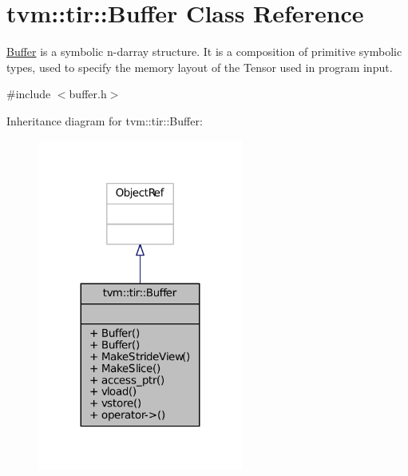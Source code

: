 \hypertarget{classtvm_1_1tir_1_1Buffer}{}\section{tvm\+:\+:tir\+:\+:Buffer Class Reference}
\label{classtvm_1_1tir_1_1Buffer}


\hyperlink{classtvm_1_1tir_1_1Buffer}{Buffer} is a symbolic n-\/darray structure. It is a composition of primitive symbolic types, used to specify the memory layout of the Tensor used in program input.  




{\ttfamily \#include $<$buffer.\+h$>$}



Inheritance diagram for tvm\+:\+:tir\+:\+:Buffer\+:
\nopagebreak
\begin{figure}[H]
\begin{center}
\leavevmode
\includegraphics[width=191pt]{classtvm_1_1tir_1_1Buffer__inherit__graph}
\end{center}
\end{figure}


